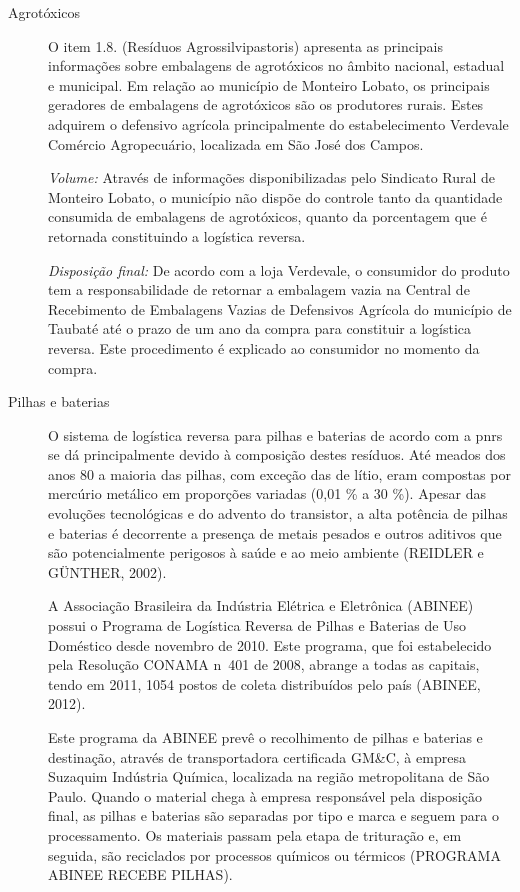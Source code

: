 	
	
	
	\begin{description}
		\item[Agrotóxicos] O item 1.8. (Resíduos Agrossilvipastoris) apresenta as principais informações sobre embalagens de agrotóxicos no âmbito nacional, estadual e municipal. Em relação ao município de Monteiro Lobato, os principais geradores de embalagens de agrotóxicos são os produtores rurais. Estes adquirem o defensivo agrícola principalmente do estabelecimento Verdevale Comércio Agropecuário, localizada em São José dos Campos.
		
			\subitem \textit{Volume:} 
			Através de informações disponibilizadas pelo Sindicato Rural de Monteiro Lobato, o município não dispõe do controle tanto da quantidade consumida de embalagens de agrotóxicos, quanto da porcentagem que é retornada constituindo a logística reversa. 
		
			\subitem \textit{Disposição final:}
			 De acordo com a loja Verdevale, o consumidor do produto tem a responsabilidade de retornar a embalagem vazia na Central de Recebimento de Embalagens Vazias de Defensivos Agrícola do município de Taubaté até o prazo de um ano da compra para constituir a logística reversa. Este procedimento é explicado ao consumidor no momento da compra.	

	
		\item[Pilhas e baterias] O sistema de logística reversa para pilhas e baterias de acordo com a \gls{pnrs} se dá principalmente devido à composição destes resíduos. Até meados dos anos 80 a maioria das pilhas, com exceção das de lítio, eram compostas por mercúrio metálico em proporções variadas (0,01 \% a 30 \%). Apesar das evoluções tecnológicas e do advento do transistor, a alta potência de pilhas e baterias é decorrente a presença de metais pesados e outros aditivos que são potencialmente perigosos à saúde e ao meio ambiente (REIDLER e GÜNTHER, 2002).
		
		A Associação Brasileira da Indústria Elétrica e Eletrônica (ABINEE) possui o Programa de Logística Reversa de Pilhas e Baterias de Uso Doméstico desde novembro de 2010. Este programa, que foi estabelecido pela Resolução CONAMA n\textdegree\ 401 de 2008, abrange a todas as capitais, tendo em 2011, 1054 postos de coleta distribuídos pelo país (ABINEE, 2012).
		
		Este programa da ABINEE prevê o recolhimento de pilhas e baterias e destinação, através de transportadora certificada GM\&C, à empresa Suzaquim Indústria Química, localizada na região metropolitana de São Paulo. Quando o material chega à empresa responsável pela disposição final, as pilhas e baterias são separadas por tipo e marca e seguem para o processamento. Os materiais passam pela etapa de trituração e, em seguida, são reciclados por processos químicos ou térmicos (PROGRAMA ABINEE RECEBE PILHAS).
		

\end{description}
